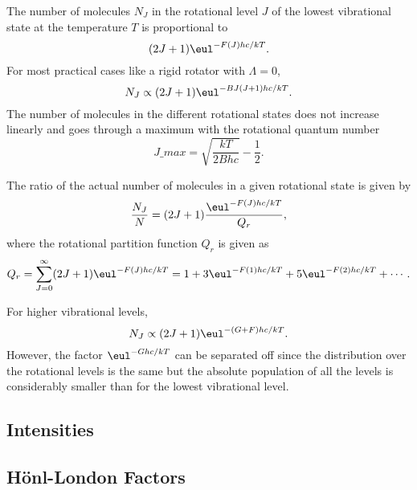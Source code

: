 The number of molecules $N_J$ in the rotational level $J$ of the lowest vibrational state at the temperature $T$ is proportional to
\begin{equation*}
    (2J + 1)\eul^{-F(J)hc/kT}.
\end{equation*}
For most practical cases like a rigid rotator with $\Lambda = 0$,
\begin{equation*}
    N_J \propto (2J + 1)\eul^{-BJ(J + 1)hc/kT}.
\end{equation*}
The number of molecules in the different rotational states does not increase linearly and goes through a maximum with the rotational quantum number
\begin{equation*}
    J\_{max} = \sqrt{\frac{kT}{2Bhc}} - \frac{1}{2}.
\end{equation*}

The ratio of the actual number of molecules in a given rotational state is given by
\begin{equation*}
    \frac{N_J}{N} = (2J + 1)\frac{\eul^{-F(J)hc/kT}}{Q_r},
\end{equation*}
where the rotational partition function $Q_r$ is given as
\begin{equation}
    Q_r = \sum_{J=0}^{\infty}(2J + 1)\eul^{-F(J)hc/kT} = 1 + 3\eul^{-F(1)hc/kT} + 5\eul^{-F(2)hc/kT} + \dotsb.
\end{equation}

For higher vibrational levels,
\begin{equation}
    N_J \propto (2J + 1)\eul^{-(G + F)hc/kT}.
\end{equation}
However, the factor $\eul^{-Ghc/kT}$ can be separated off since the distribution over the rotational levels is the same but the absolute population of all the levels is considerably smaller than for the lowest vibrational level.

\subsection{Intensities}

\subsection{H\"onl-London Factors}

